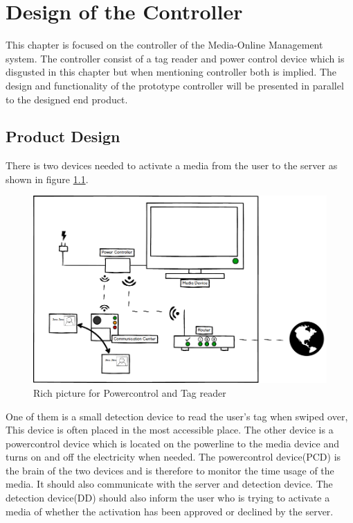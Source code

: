 \chapter{Design of the Controller}
This chapter is focused on the controller of the Media-Online Management system. The controller consist of a tag reader and power control device which is disgusted in this chapter but when mentioning controller both is implied. \newline
The design and functionality of the prototype controller will be presented in parallel to the designed end product. \newline

\section{Product Design}

There is two devices needed to activate a media from the user to the server as shown in figure \ref{fig:Power&Tagdevice}.


\begin{figure}[h]
	\centering
		\includegraphics[width=1.00\textwidth]{images/Power&Tagdevice.png}
	\caption{Rich picture for Powercontrol and Tag reader}
	\label{fig:Power&Tagdevice}
\end{figure}

One of them is a small detection device to read the user's tag when swiped over, This device is often placed in the most accessible place. \newline
The other device is a powercontrol device which is located on the powerline to the media device and turns on and off the electricity when needed.\newline
The powercontrol device(PCD) is the brain of the two devices and is therefore to monitor the time usage of the media. It should also communicate with the server and detection device. \newline
The detection device(DD) should also inform the user who is trying to activate a media of whether the activation has been approved or declined by the server.

